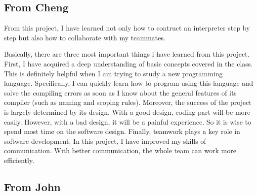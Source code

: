 \documentclass[onecolumn,titlepage]{article}
\begin{document}
\subsection{From Cheng}
From this project, I have learned not only how to contruct an
interpreter step by step but also how to collaborate with my
teammates.

Basically, there are three most important things i have learned from
this project. First, I have acquired a deep understanding of basic
concepts covered in the class. This is definitely helpful when I am
trying to study a new programming language. Specifically, I can
quickly learn how to program using this language and solve the
compiling errors as soon as I know about the general features of its
compiler (such as naming and scoping rules). Moreover, the success of
the project is largely determined by its design. With a good design,
coding part will be more easily. However, with a bad design, it will
be a painful experience. So it is wise to spend most time on the
software design. Finally, teamwork plays a key role in software
development. In this project, I have improved my skills of
communication. With better communication, the whole team can work more
efficiently.


\subsection{From John}
\end{document}
